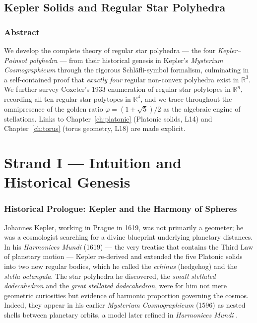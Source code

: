 \chapter{Kepler Solids and Regular Star Polyhedra}
\label{ch:kepler-solids}


\section*{Abstract}

We develop the complete theory of regular star polyhedra — the
four \emph{Kepler–Poinsot polyhedra} — from their historical
genesis in Kepler's \emph{Mysterium Cosmographicum} through the
rigorous Schläfli-symbol formalism, culminating in a
self-contained proof that \emph{exactly four} regular
non-convex polyhedra exist in \(\mathbb{R}^3\).  We further
survey Coxeter's 1933 enumeration of regular star polytopes in
\(\mathbb{R}^n\), recording all ten regular star polytopes in
\(\mathbb{R}^4\), and we trace throughout the omnipresence of
the golden ratio \(\varphi = (1+\sqrt{5})/2\) as the algebraic
engine of stellations.  Links to Chapter~\ref{ch:platonic}
(Platonic solids, L14) and Chapter~\ref{ch:torus} (torus
geometry, L18) are made explicit.

\part*{Strand I — Intuition and Historical Genesis}

\section{Historical Prologue: Kepler and the Harmony of Spheres}
\label{sec:kepler-history}

Johannes Kepler, working in Prague in 1619, was not primarily
a geometer; he was a cosmologist searching for a divine
blueprint underlying planetary distances.  In his
\emph{Harmonices Mundi} (1619) — the very treatise that
contains the Third Law of planetary motion — Kepler re-derived
and extended the five Platonic solids into two new regular
bodies, which he called the \emph{echinus} (hedgehog) and the
\emph{stella octangula}.  The star polyhedra he discovered,
the \emph{small stellated dodecahedron} and the \emph{great
stellated dodecahedron}, were for him not mere geometric
curiosities but evidence of harmonic proportion governing the
cosmos.  Indeed, they appear in his earlier \emph{Mysterium
Cosmographicum} (1596) as nested shells between planetary
orbits, a model later refined in \emph{Harmonices Mundi}
\cite{cromwell_polyhedra}.

